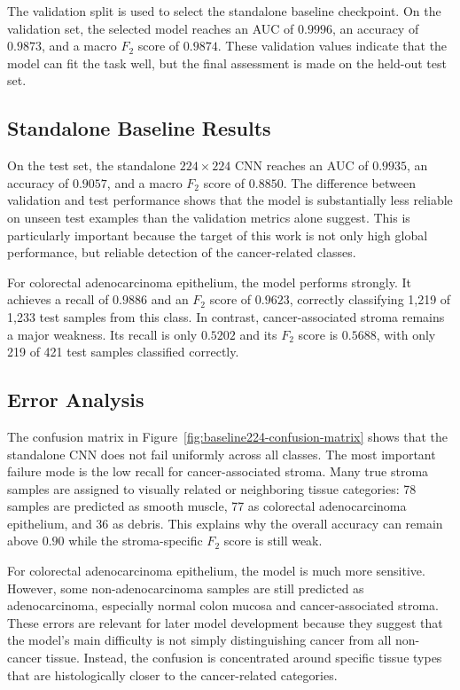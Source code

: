 The validation split is used to select the standalone baseline checkpoint. On
the validation set, the selected model reaches an AUC of $0.9996$, an accuracy of
$0.9873$, and a macro $F_2$ score of $0.9874$. These validation values indicate
that the model can fit the task well, but the final assessment is made on the
held-out test set.

\subsection{Standalone Baseline Results}
On the test set, the standalone $224 \times 224$ CNN reaches an AUC of $0.9935$,
an accuracy of $0.9057$, and a macro $F_2$ score of $0.8850$. The difference
between validation and test performance shows that the model is substantially
less reliable on unseen test examples than the validation metrics alone suggest.
This is particularly important because the target of this work is not only high
global performance, but reliable detection of the cancer-related classes.

For colorectal adenocarcinoma epithelium, the model performs strongly. It
achieves a recall of $0.9886$ and an $F_2$ score of $0.9623$, correctly
classifying 1,219 of 1,233 test samples from this class. In contrast,
cancer-associated stroma remains a major weakness. Its recall is only $0.5202$
and its $F_2$ score is $0.5688$, with only 219 of 421 test samples classified
correctly.



\subsection{Error Analysis}
The confusion matrix in Figure~\ref{fig:baseline224-confusion-matrix} shows that
the standalone CNN does not fail uniformly across all classes. The most important
failure mode is the low recall for cancer-associated stroma. Many true stroma
samples are assigned to visually related or neighboring tissue categories:
78 samples are predicted as smooth muscle, 77 as colorectal adenocarcinoma
epithelium, and 36 as debris. This explains why the overall accuracy can remain
above $0.90$ while the stroma-specific $F_2$ score is still weak.

For colorectal adenocarcinoma epithelium, the model is much more sensitive.
However, some non-adenocarcinoma samples are still predicted as adenocarcinoma,
especially normal colon mucosa and cancer-associated stroma. These errors are
relevant for later model development because they suggest that the model's main
difficulty is not simply distinguishing cancer from all non-cancer tissue.
Instead, the confusion is concentrated around specific tissue types that are
histologically closer to the cancer-related categories.

